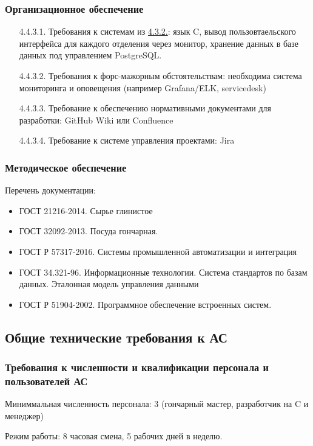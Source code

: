 \documentclass[16pt,a4paper]{article}
\begin{document}
\subsubsection{Организационное обеспечение}
\begin{enumerate}
    \item [4.4.3.1.] Требования к системам из \hyperref[sec:4.3.2.]{4.3.2.}: язык C, вывод пользовтаельского интерфейса для каждого отделения через монитор, хранение данных в базе данных под управлением PostgreSQL.
    \item [4.4.3.2.] Требования к форс-мажорным обстоятельствам: необходима система мониторинга и оповещения (например Grafana/ELK, servicedesk)
    \item [4.4.3.3.] Требование к обеспечению нормативными документами для разработки: GitHub Wiki или Confluence
    \item [4.4.3.4.] Требование к системе управления проектами: Jira
\end{enumerate}
\subsubsection{Методическое обеспечение}
Перечень документации:
\begin{itemize}
    \item ГОСТ 21216-2014. Сырье глинистое
    \item ГОСТ 32092-2013. Посуда гончарная.
    \item ГОСТ Р 57317-2016. Системы промышленной автоматизации и интеграция
    \item ГОСТ 34.321-96. Информационные технологии. Система стандартов по базам данных. Эталонная модель управления данными
    \item ГОСТ Р 51904-2002. Программное обеспечение встроенных систем.
\end{itemize}
\subsection{Общие технические требования к АС}
\subsubsection{Требования к численности и квалификации персонала и пользователей АС}
\label{sec:4.5.1.}
Миниммальная численность персонала: 3 (гончарный мастер, разработчик на C и менеджер)

Режим работы: 8 часовая смена, 5 рабочих дней в неделю.
\end{document}
